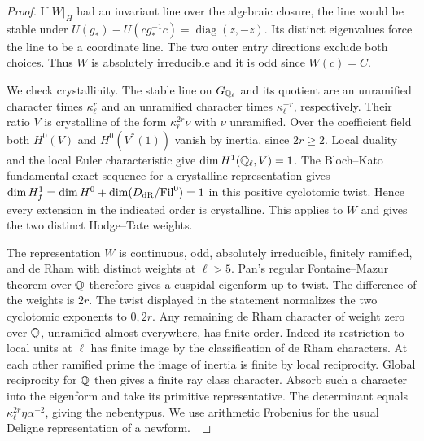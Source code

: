 \documentclass[a4paper,11pt]{article}
\theoremstyle{definition}
\theoremstyle{remark}
\numberwithin{equation}{section}
\begin{document}
\begin{proof}
If \(W|_H\) had an invariant line over the algebraic closure,
the line would be stable under
\(U(g_*)-U(cg_*^{-1}c)=\operatorname{diag}(z,-z)\).
Its distinct eigenvalues force the line to be a coordinate line.
The two outer entry directions exclude both choices. Thus \(W\)
is absolutely irreducible and it is odd since \(W(c)=C\).

We check crystallinity. The stable line on \(G_{\mathbb Q_\ell}\)
and its quotient are an unramified character times
\(\kappa_\ell^r\) and an unramified character times
\(\kappa_\ell^{-r}\), respectively. Their ratio \(V\) is
crystalline of the form \(\kappa_\ell^{2r}\nu\) with \(\nu\)
unramified. Over the coefficient field both \(H^0(V)\) and
\(H^0(V^*(1))\) vanish by inertia, since \(2r\ge2\).
Local duality and the local Euler characteristic give
\(\dim H^1(\mathbb Q_\ell,V)=1\). The Bloch--Kato fundamental
exact sequence for a crystalline representation gives
\(\dim H^1_f=\dim H^0+\dim(D_{\rm dR}/\mathrm{Fil}^0)=1\)
in this positive cyclotomic twist. Hence every extension in
the indicated order is crystalline. This applies to \(W\)
and gives the two distinct Hodge--Tate weights.~\cite{VI-IV-VI-bk117}

The representation \(W\) is continuous, odd, absolutely
irreducible, finitely ramified, and de Rham with distinct weights
at \(\ell>5\). Pan's regular Fontaine--Mazur theorem over \(\mathbb Q\)
therefore gives a cuspidal eigenform up to twist. The difference of the weights
is \(2r\). The twist displayed in the statement normalizes the
two cyclotomic exponents to \(0,2r\). Any remaining de Rham
character of weight zero over \(\mathbb Q\), unramified almost
everywhere, has finite order. Indeed its restriction to local
units at \(\ell\) has finite image by the classification of
de Rham characters. At each other ramified prime the image of
inertia is finite by local reciprocity. Global reciprocity for
\(\mathbb Q\) then gives a finite ray class character. Absorb such a
character into the eigenform and take its primitive
representative. The determinant equals
\(\kappa_\ell^{2r}\eta\alpha^{-2}\), giving the nebentypus.
We use arithmetic Frobenius for the usual Deligne
representation of a newform.~\cite{VI-IV-VI-pan40}


\end{proof}
\end{document}
